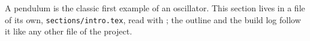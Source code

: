 A pendulum is the classic first example of an oscillator. This section lives in a
file of its own, \texttt{sections/intro.tex}, read with \verb||; the outline
and the build log follow it like any other file of the project.
